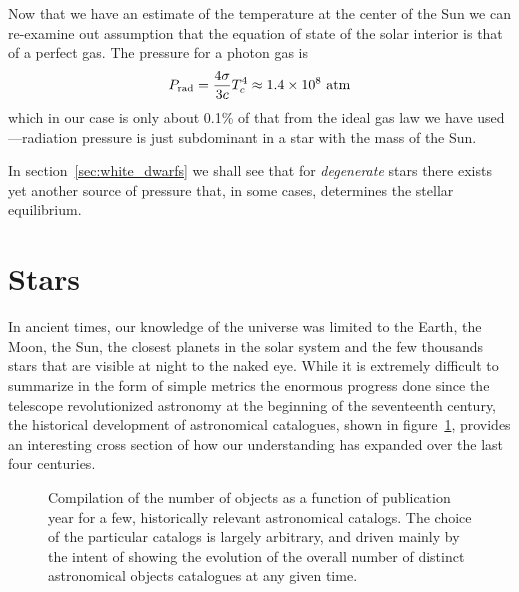 Now that we have an estimate of the temperature at the center of the Sun we can
re-examine out assumption that the equation of state of the solar interior is that
of a perfect gas. The pressure for a photon gas is
\begin{align*}
	P_\text{rad} = \frac{4\sigma}{3c} T_c^4 \approx 1.4 \times 10^{8}~\text{atm}
\end{align*}
which in our case is only about 0.1\% of that from the ideal gas law we have
used---radiation pressure is just subdominant in a star with the mass of the
Sun.

In section~\ref{sec:white_dwarfs} we shall see that for \emph{degenerate} stars
there exists yet another source of pressure that, in some cases, determines the
stellar equilibrium.



\section{Stars}
\label{sec:stars}

In ancient times, our knowledge of the universe was limited to the Earth, the
Moon, the Sun, the closest planets in the solar system and the few thousands
stars that are visible at night to the naked eye. While it is extremely difficult
to summarize in the form of simple metrics the enormous progress done since the
telescope revolutionized astronomy at the beginning of the seventeenth century,
the historical development of astronomical catalogues, shown in
figure~\ref{fig:astronomical_catalogues}, provides an interesting cross section
of how our understanding has expanded over the last four centuries.

\begin{figure}[htbp!]
	
  \caption{Compilation of the number of objects as a function of publication year
    for a few, historically relevant astronomical catalogs. The choice of the
    particular catalogs is largely arbitrary, and driven mainly by the intent
    of showing the evolution of the overall number of distinct astronomical objects
    catalogues at any given time.}
    \label{fig:astronomical_catalogues}
\end{figure}

